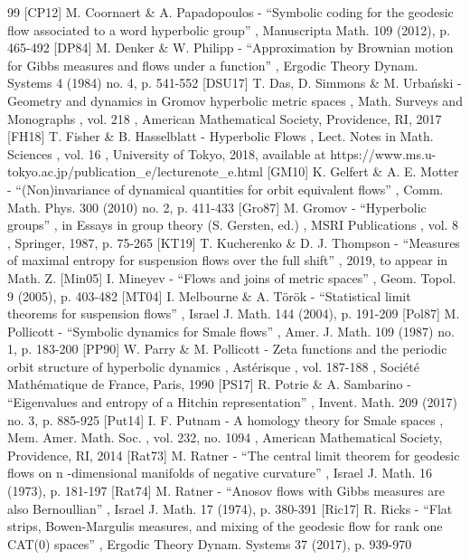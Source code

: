 \documentclass[11pt]{article}
\begin{document}
\begin{thebibliography}{99}
 [CP12] M. Coornaert \& A. Papadopoulos - “Symbolic coding for the geodesic flow associated to a word hyperbolic group” , Manuscripta Math. 109 (2012), p. 465-492
 [DP84] M. Denker \& W. Philipp - “Approximation by Brownian motion for Gibbs measures and flows under a function” , Ergodic Theory Dynam. Systems 4 (1984) no. 4, p. 541-552
 [DSU17] T. Das, D. Simmons \& M. Urbański - Geometry and dynamics in Gromov hyperbolic metric spaces , Math. Surveys and Monographs , vol. 218 , American Mathematical Society, Providence, RI, 2017
 [FH18] T. Fisher \& B. Hasselblatt - Hyperbolic Flows , Lect. Notes in Math. Sciences , vol. 16 , University of Tokyo, 2018, available at https://www.ms.u-tokyo.ac.jp/publication\_e/lecturenote\_e.html
 [GM10] K. Gelfert \& A. E. Motter - “(Non)invariance of dynamical quantities for orbit equivalent flows” , Comm. Math. Phys. 300 (2010) no. 2, p. 411-433
 [Gro87] M. Gromov - “Hyperbolic groups” , in Essays in group theory (S. Gersten, ed.) , MSRI Publications , vol. 8 , Springer, 1987, p. 75-265
 [KT19] T. Kucherenko \& D. J. Thompson - “Measures of maximal entropy for suspension flows over the full shift” , 2019, to appear in Math. Z.
 [Min05] I. Mineyev - “Flows and joins of metric spaces” , Geom. Topol. 9 (2005), p. 403-482
 [MT04] I. Melbourne \& A. Török - “Statistical limit theorems for suspension flows” , Israel J. Math. 144 (2004), p. 191-209
 [Pol87] M. Pollicott - “Symbolic dynamics for Smale flows” , Amer. J. Math. 109 (1987) no. 1, p. 183-200
 [PP90] W. Parry \& M. Pollicott - Zeta functions and the periodic orbit structure of hyperbolic dynamics , Astérisque , vol. 187-188 , Société Mathématique de France, Paris, 1990
 [PS17] R. Potrie \& A. Sambarino - “Eigenvalues and entropy of a Hitchin representation” , Invent. Math. 209 (2017) no. 3, p. 885-925
 [Put14] I. F. Putnam - A homology theory for Smale spaces , Mem. Amer. Math. Soc. , vol. 232, no. 1094 , American Mathematical Society, Providence, RI, 2014
 [Rat73] M. Ratner - “The central limit theorem for geodesic flows on n -dimensional manifolds of negative curvature” , Israel J. Math. 16 (1973), p. 181-197
 [Rat74] M. Ratner - “Anosov flows with Gibbs measures are also Bernoullian” , Israel J. Math. 17 (1974), p. 380-391
 [Ric17] R. Ricks - “Flat strips, Bowen-Margulis measures, and mixing of the geodesic flow for rank one CAT(0) spaces” , Ergodic Theory Dynam. Systems 37 (2017), p. 939-970

\end{thebibliography}
\end{document}
